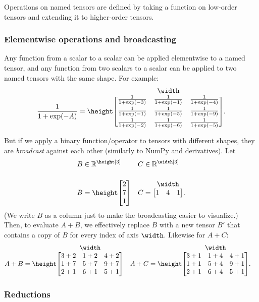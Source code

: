 \documentclass{article}
\makeatletter
\newcommand{\nmatrix}[3]{#1\begin{array}[b]{@{}c@{}}#2\\\begin{bmatrix}#3\end{bmatrix}\end{array}}
\newcommand{\reals}{\mathbb{R}}
\makeatother
\begin{document}
Operations on named tensors are defined by taking a function on low-order tensors and extending it to higher-order tensors.

\subsubsection{Elementwise operations and broadcasting}

Any function from a scalar to a scalar can be applied elementwise to a named tensor, and any function from two scalars to a scalar can be applied to two named tensors with the same shape. For example:
\begin{equation*}
\frac1{1+\exp(-A)} = \nmatrix{\height}{\width}{
  \frac1{1+\exp(-3)} & \frac1{1+\exp(-1)} & \frac1{1+\exp(-4)} \\[1ex]
  \frac1{1+\exp(-1)} & \frac1{1+\exp(-5)} & \frac1{1+\exp(-9)} \\[1ex]
  \frac1{1+\exp(-2)} & \frac1{1+\exp(-6)} & \frac1{1+\exp(-5)}
}.
\end{equation*}

But if we apply a binary function/operator to tensors with different shapes, they are \emph{broadcast} against each other (similarly to NumPy and derivatives). Let
\begin{align*}
  B &\in \reals^{\height[3]} & C &\in \reals^{\width[3]} \\
  B &= \nmatrix{\height}{}{
    2 \\ 7 \\ 1
  } & 
  C &= \nmatrix{}{\width}{
    1 & 4 & 1
  }.
\end{align*}
(We write $B$ as a column just to make the broadcasting easier to visualize.) Then, to evaluate $A+B$, we effectively replace $B$ with a new tensor $B'$ that contains a copy of $B$ for every index of axis $\width$. Likewise for $A+C$:
\begin{align*}
A + B &= \nmatrix{\height}{\width}{
  3+2 & 1+2 & 4+2 \\
  1+7 & 5+7 & 9+7 \\
  2+1 & 6+1 & 5+1
} &
A + C &= \nmatrix{\height}{\width}{
  3+1 & 1+4 & 4+1 \\
  1+1 & 5+4 & 9+1 \\
  2+1 & 6+4 & 5+1
}.
\end{align*}

\subsubsection{Reductions}
\label{sec:reductions}
\end{document}
